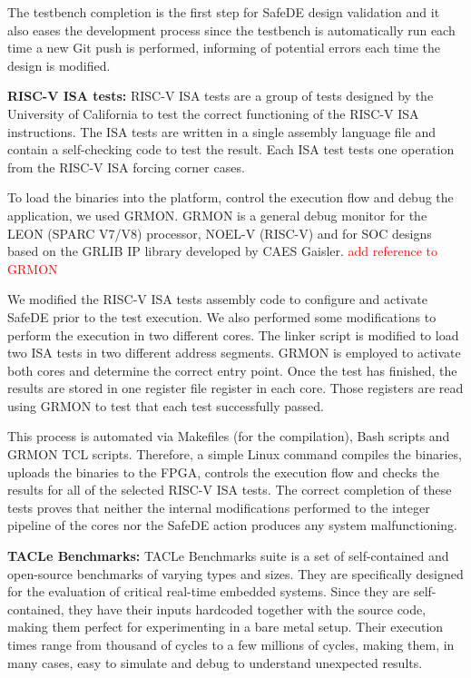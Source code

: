 The testbench completion is the first step for SafeDE design validation and it also eases the development process since the testbench is automatically run each time a new Git push is performed, informing of potential errors each time the design is modified.



\textbf{RISC-V ISA tests:} RISC-V ISA tests \cite{ISAtests} are a group of tests designed by the University of California to test the correct functioning of the RISC-V ISA instructions. The ISA tests are written in a single assembly language file and contain a self-checking code to test the result. Each ISA test tests one operation from the RISC-V ISA forcing corner cases. 

To load the binaries into the platform, control the execution flow and debug the application, we used GRMON. GRMON is a general debug monitor for the LEON (SPARC V7/V8) processor, NOEL-V (RISC-V) and for SOC designs based on the GRLIB IP library developed by CAES Gaisler. 
\textcolor{red}{add reference to GRMON} 

We modified the RISC-V ISA tests assembly code to configure and activate SafeDE prior to the test execution. We also performed some modifications to perform the execution in two different cores. The linker script is modified to load two ISA tests in two different address segments. GRMON is employed to activate both cores and determine the correct entry point. Once the test has finished, the results are stored in one register file register in each core. Those registers are read using GRMON to test that each test successfully passed. 

This process is automated via Makefiles (for the compilation), Bash scripts and GRMON TCL scripts. Therefore, a simple Linux command compiles the binaries, uploads the binaries to the FPGA, controls the execution flow and checks the results for all of the selected RISC-V ISA tests. The correct completion of these tests proves that neither the internal modifications performed to the integer pipeline of the cores nor the SafeDE action produces any system malfunctioning.

\textbf{TACLe Benchmarks:} TACLe Benchmarks suite \cite{falk2016taclebench} is a set of self-contained and open-source benchmarks of varying types and sizes. They are specifically designed for the evaluation of critical real-time embedded systems. Since they are self-contained, they have their inputs hardcoded together with the source code, making them perfect for experimenting in a bare metal setup. Their execution times range from thousand of cycles to a few millions of cycles, making them, in many cases, easy to simulate and debug to understand unexpected results.

